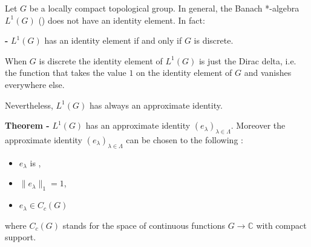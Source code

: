 \documentclass[12pt]{article}
\begin{document}
Let $G$ be a locally compact topological group. In general, the Banach *-algebra $L^1(G)$ () does not have an identity element. In fact:

{\bf {} -} $L^1(G)$ has an identity element if and only if $G$ is discrete.

When $G$ is discrete the identity element of $L^1(G)$ is just the Dirac delta, i.e. the function that takes the value $1$ on the identity element of $G$ and vanishes everywhere else.

Nevertheless, $L^1(G)$ has always an approximate identity.

{\bf Theorem -} $L^1(G)$ has an approximate identity $(e_{\lambda})_{\lambda \in \Lambda}$. Moreover the approximate identity $(e_{\lambda})_{\lambda \in \Lambda}$ can be chosen to  the following :
\begin{itemize}
\item $e_{\lambda}$ is ,
\item $\|e_\lambda\|_1 = 1$,
\item $e_{\lambda} \in C_c(G)$
\end{itemize}
where $C_c(G)$ stands for the space of continuous functions $G \longrightarrow \mathbb{C}$ with compact support.
\end{document}

